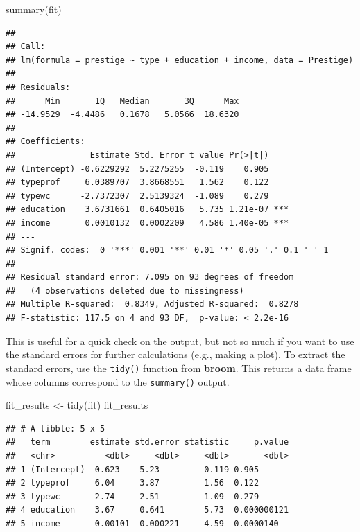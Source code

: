 \documentclass[
  12pt,
  oneside,openany]{book}
\newenvironment{Shaded}{\begin{snugshade}}{\end{snugshade}}
\newcommand{\FunctionTok}[1]{\textcolor[rgb]{0.00,0.00,0.00}{#1}}
\newcommand{\NormalTok}[1]{#1}
\newcommand{\OtherTok}[1]{\textcolor[rgb]{0.56,0.35,0.01}{#1}}
\begin{document}
\begin{Shaded}
\begin{Highlighting}[]
\FunctionTok{summary}\NormalTok{(fit)}
\end{Highlighting}
\end{Shaded}

\begin{verbatim}
## 
## Call:
## lm(formula = prestige ~ type + education + income, data = Prestige)
## 
## Residuals:
##      Min       1Q   Median       3Q      Max 
## -14.9529  -4.4486   0.1678   5.0566  18.6320 
## 
## Coefficients:
##               Estimate Std. Error t value Pr(>|t|)    
## (Intercept) -0.6229292  5.2275255  -0.119    0.905    
## typeprof     6.0389707  3.8668551   1.562    0.122    
## typewc      -2.7372307  2.5139324  -1.089    0.279    
## education    3.6731661  0.6405016   5.735 1.21e-07 ***
## income       0.0010132  0.0002209   4.586 1.40e-05 ***
## ---
## Signif. codes:  0 '***' 0.001 '**' 0.01 '*' 0.05 '.' 0.1 ' ' 1
## 
## Residual standard error: 7.095 on 93 degrees of freedom
##   (4 observations deleted due to missingness)
## Multiple R-squared:  0.8349, Adjusted R-squared:  0.8278 
## F-statistic: 117.5 on 4 and 93 DF,  p-value: < 2.2e-16
\end{verbatim}

This is useful for a quick check on the output, but not so much if you want to use the standard errors for further calculations (e.g., making a plot). To extract the standard errors, use the \texttt{tidy()} function from \textbf{broom}. This returns a data frame whose columns correspond to the \texttt{summary()} output.

\begin{Shaded}
\begin{Highlighting}[]
\NormalTok{fit\_results }\OtherTok{\textless{}{-}} \FunctionTok{tidy}\NormalTok{(fit)}
\NormalTok{fit\_results}
\end{Highlighting}
\end{Shaded}

\begin{verbatim}
## # A tibble: 5 x 5
##   term        estimate std.error statistic     p.value
##   <chr>          <dbl>     <dbl>     <dbl>       <dbl>
## 1 (Intercept) -0.623    5.23        -0.119 0.905      
## 2 typeprof     6.04     3.87         1.56  0.122      
## 3 typewc      -2.74     2.51        -1.09  0.279      
## 4 education    3.67     0.641        5.73  0.000000121
## 5 income       0.00101  0.000221     4.59  0.0000140
\end{verbatim}
\end{document}
